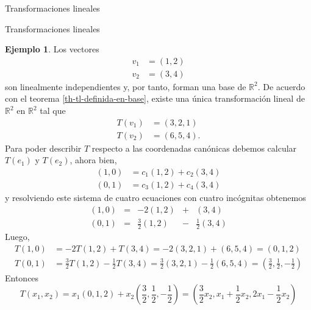 \documentclass[a4paper,12pt,twoside,spanish,reqno]{amsbook}
\theoremstyle{definition}
\newtheorem{ejemplo}{Ejemplo}[section]
\theoremstyle{remark}
\newcommand{\R}{\mathbb R}
\begin{document}
\begin{chapter}{Transformaciones lineales}
\begin{section}{Transformaciones lineales}
        \begin{ejemplo}
            Los vectores
            \begin{align*}
                v_1 &= (1,2)\\
                v_2 &= (3,4)
            \end{align*}
            son linealmente independientes y, por tanto, forman una base de $\R^2$. De acuerdo con el teorema \ref{th-tl-definida-en-base}, existe una única transformación lineal de $\R^2$ en $\R^2$ tal que
            \begin{align*}
                T(v_1) &= (3,2, 1) \\
                T(v_2) &= (6, 5,4).
            \end{align*}
            Para poder describir $T$ respecto a las coordenadas canónicas debemos calcular $T(e_1)$ y $T(e_2)$,  ahora bien,
            \begin{align*}
            (1,0) &= c_{1}(1,2) + c_{2}(3,4)\\
            (0,1) &= c_{3}(1,2) + c_{4}(3,4)
            \end{align*}
            y resolviendo este sistema de cuatro ecuaciones con cuatro incógnitas obtenemos
            \begin{equation*}
            \begin{array}{rcrcr}
            (1,0) &=& -2(1,2) &+ &(3,4)\\
            (0,1) &=& \displaystyle\frac32(1,2) &- &\displaystyle\frac12(3,4)
            \end{array}
            \end{equation*}
            Luego, 
                \begin{align*}
            T(1,0) &= -2T(1,2)+ T(3,4) = -2(3,2, 1)+(6, 5,4) = (0,1,2)\\
            T(0,1) &= \displaystyle\frac32T(1,2) - \displaystyle\frac12T(3,4) = \displaystyle\frac32(3,2,1) - \displaystyle\frac12(6, 5,4)= (\displaystyle\frac32,\displaystyle\frac12,-\displaystyle\frac12)
            \end{align*}
            Entonces
                \begin{equation*}
            T(x_1,x_2) = x_1(0,1,2) + x_2		 (\displaystyle\frac32,\displaystyle\frac12,-\displaystyle\frac12)
            = (\displaystyle\frac32x_2,x_1+\displaystyle\frac12x_2,2x_1-\displaystyle\frac12x_2)
            \end{equation*}
        \end{ejemplo}
        

\end{section}
\end{chapter}
\end{document}
